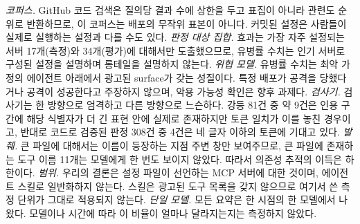 \documentclass[acmsmall,screen,review,anonymous]{acmart}
\begin{document}
\emph{코퍼스.} GitHub 코드 검색은 질의당 결과 수에 상한을 두고 표집이 아니라 관련도 순위로 반환하므로, 이 코퍼스는 배포의 무작위 표본이 아니다. 커밋된 설정은 사람들이 실제로 실행하는 설정과 다를 수도 있다. \emph{판정 대상 집합.} 효과는 가장 자주 설정되는 서버 17개(측정)와 34개(평가)에 대해서만 도출했으므로, 유병률 수치는 인기 서버로 구성된 설정을 설명하며 롱테일을 설명하지 않는다. \emph{위협 모델.} 유병률 수치는 최악 가정의 에이전트 아래에서 광고된 surface가 갖는 성질이다. 특정 배포가 공격을 당했다거나 공격이 성공한다고 주장하지 않으며, 악용 가능성 확인은 향후 과제다. \emph{검사기.} 검사기는 한 방향으로 엄격하고 다른 방향으로 느슨하다. 강등 81건 중 약 9건은 인용 구간에 해당 식별자가 더 긴 표현 안에 실제로 존재하지만 토큰 일치가 이를 놓친 경우이고, 반대로 코드로 검증된 판정 308건 중 4건은 네 글자 이하의 토큰에 기대고 있다. \emph{발췌.} 큰 파일에 대해서는 이름이 등장하는 지점 주변 창만 보여주므로, 큰 파일에 존재하는 도구 이름 11개는 모델에게 한 번도 보이지 않았다. 따라서 의존성 추적의 이득은 하한이다. \emph{범위.} 우리의 결론은 설정 파일이 선언하는 MCP 서버에 대한 것이며, 에이전트 스킬로 일반화하지 않는다. 스킬은 광고된 도구 목록을 갖지 않으므로 여기서 쓴 측정 단위가 그대로 적용되지 않는다. \emph{단일 모델.} 모든 요약은 한 시점의 한 모델에서 나왔다. 모델이나 시간에 따라 이 비율이 얼마나 달라지는지는 측정하지 않았다.
\end{document}
